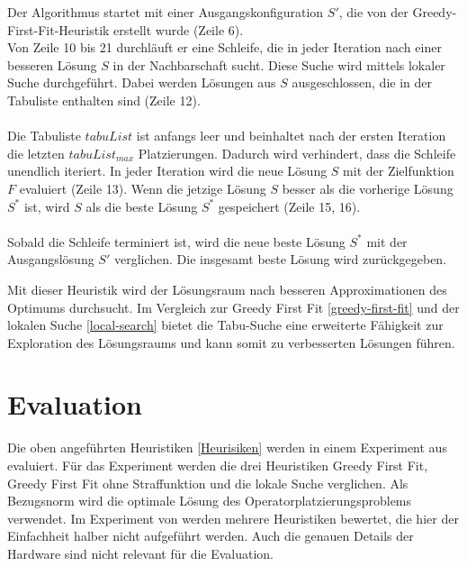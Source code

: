 \documentclass{article}
\begin{document}
Der Algorithmus startet mit einer Ausgangskonfiguration $S'$, die von der Greedy-First-Fit-Heuristik erstellt wurde (Zeile 6). \\ 
Von Zeile 10 bis 21 durchläuft er eine Schleife, die in jeder Iteration nach einer besseren Lösung $S$ in der Nachbarschaft sucht. 
Diese Suche wird mittels lokaler Suche durchgeführt. Dabei werden Lösungen aus $S$ ausgeschlossen, die in der Tabuliste enthalten sind (Zeile 12). \\ \\
Die Tabuliste $tabuList$ ist anfangs leer und beinhaltet nach der ersten Iteration die letzten $tabuList_{max}$ Platzierungen. 
Dadurch wird verhindert, dass die Schleife unendlich iteriert.
In jeder Iteration wird die neue Lösung $S$ mit der Zielfunktion $F$ evaluiert (Zeile 13). %
Wenn die jetzige Lösung $S$ besser als die vorherige Lösung $S^*$ ist, wird $S$ als die beste Lösung $S^*$ gespeichert (Zeile 15, 16). \\ \\

Sobald die Schleife terminiert ist, wird die neue beste Lösung $S^*$ mit der Ausgangslösung $S'$ verglichen. Die insgesamt beste Lösung wird zurückgegeben. 



Mit dieser Heuristik wird der Lösungsraum nach besseren Approximationen des Optimums durchsucht. 
Im Vergleich zur Greedy First Fit \ref{greedy-first-fit} und der 
lokalen Suche \ref{local-search} bietet die Tabu-Suche eine erweiterte Fähigkeit zur Exploration 
des Lösungsraums und kann somit zu verbesserten Lösungen führen.


\section{Evaluation}
Die oben angeführten Heuristiken \ref{Heurisiken} werden in einem Experiment aus \cite{efficient-operator-placement} evaluiert. 
Für das Experiment werden die drei Heuristiken Greedy First Fit, Greedy First Fit ohne Straffunktion und die lokale Suche verglichen. 
Als Bezugsnorm wird die optimale Lösung des Operatorplatzierungsproblems verwendet. 
Im Experiment von \cite{efficient-operator-placement} werden mehrere Heuristiken bewertet, die hier der Einfachheit halber nicht aufgeführt werden. 
Auch die genauen Details der Hardware sind nicht relevant für die Evaluation.
\end{document}
